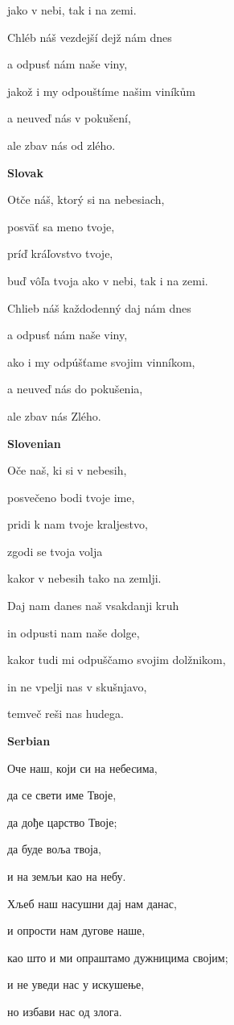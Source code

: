 jako v nebi, tak i na zemi.

Chléb náš vezdejší dejž nám dnes

a odpusť nám naše viny,

jakož i my odpouštíme našim viníkům

a neuveď nás v pokušení,

ale zbav nás od zlého.

\textbf{Slovak}

Otče náš, ktorý si na nebesiach,

posväť sa meno tvoje,

príď kráľovstvo tvoje,

buď vôľa tvoja ako v nebi, tak i na zemi.

Chlieb náš každodenný daj nám dnes

a odpusť nám naše viny,

ako i my odpúšťame svojim vinníkom,

a neuveď nás do pokušenia,

ale zbav nás Zlého.

\textbf{Slovenian}

Oče naš, ki si v nebesih,

posvečeno bodi tvoje ime,

pridi k nam tvoje kraljestvo,

zgodi se tvoja volja 

kakor v nebesih tako na zemlji.

Daj nam danes naš vsakdanji kruh

in odpusti nam naše dolge,

kakor tudi mi odpuščamo svojim dolžnikom,

in ne vpelji nas v skušnjavo, 

temveč reši nas hudega.

\textbf{Serbian}

Оче наш, који си на небесима,

да се свети име Твоје,

да дође царство Твоје;

да буде воља твоја,

и на земљи као на небу.

Хљеб наш насушни дај нам данас,

и опрости нам дугове наше,

као што и ми опраштамо дужницима својим;

и не уведи нас у искушење,

но избави нас од злога.

